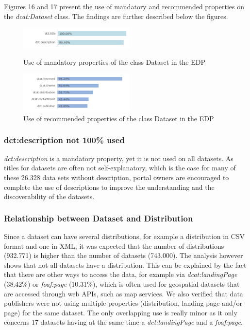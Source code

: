 \documentclass[<options>]{elsarticle}
\begin{document}
Figures 16 and 17 present the use of mandatory and recommended properties on the \textit{dcat:Dataset} class. The findings are further described below the figures.
\begin{figure}[H]
\includegraphics{replace19.png}
\caption{Use of mandatory properties of the class Dataset in the EDP}
\includegraphics{replace20.png}
\caption{Use of recommended properties of the class Dataset in the EDP}
\end{figure}


\subsubsection{dct:description not 100\% used}
\textit{dct:description} is a mandatory property, yet it is not used on all datasets. As titles for datasets are often not self-explanatory, which is the case for many of these  26.328 data sets without description, portal owners are encouraged to complete the use of descriptions to improve the understanding and the discoverability of the datasets.

\subsubsection{Relationship between Dataset and Distribution}
Since a dataset can have several distributions, for example a distribution in CSV format and one in XML, it was expected that the number of distributions (932.771) is higher than the number of datasets (743.000). The analysis however shows that not all datasets have a distribution. This can be explained by the fact that there are other ways to access the data, for example via \textit{dcat:landingPage} (38.42\%) or \textit{foaf:page} (10.31\%), which is often used for geospatial datasets that are accessed through web APIs, such as map services.  We also verified that data publishers were not using multiple properties (distribution, landing page and/or page) for the same dataset. The only overlapping use is really minor as it only concerns 17 datasets having at the same time a \textit{dct:landingPage} and a \textit{foaf:page}.
\end{document}
